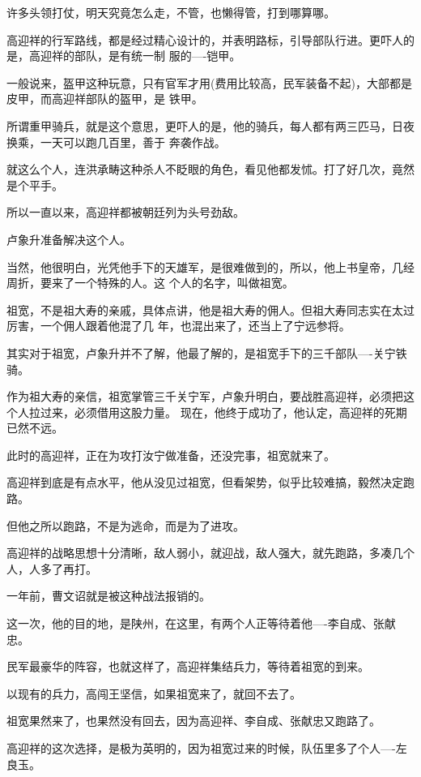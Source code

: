 \documentclass[11pt,a4paper,onecolumn]{article}
\begin{document}
许多头领打仗，明天究竟怎么走，不管，也懒得管，打到哪算哪。

高迎祥的行军路线，都是经过精心设计的，并表明路标，引导部队行进。更吓人的是，高迎祥的部队，是有统一制
服的----铠甲。

一般说来，盔甲这种玩意，只有官军才用(费用比较高，民军装备不起)，大部都是皮甲，而高迎祥部队的盔甲，是
铁甲。

所谓重甲骑兵，就是这个意思，更吓人的是，他的骑兵，每人都有两三匹马，日夜换乘，一天可以跑几百里，善于
奔袭作战。

就这么个人，连洪承畴这种杀人不眨眼的角色，看见他都发怵。打了好几次，竟然是个平手。

所以一直以来，高迎祥都被朝廷列为头号劲敌。

卢象升准备解决这个人。

当然，他很明白，光凭他手下的天雄军，是很难做到的，所以，他上书皇帝，几经周折，要来了一个特殊的人。这
个人的名字，叫做祖宽。

祖宽，不是祖大寿的亲戚，具体点讲，他是祖大寿的佣人。但祖大寿同志实在太过厉害，一个佣人跟着他混了几
年，也混出来了，还当上了宁远参将。

其实对于祖宽，卢象升并不了解，他最了解的，是祖宽手下的三千部队----关宁铁骑。

作为祖大寿的亲信，祖宽掌管三千关宁军，卢象升明白，要战胜高迎祥，必须把这个人拉过来，必须借用这股力量。
现在，他终于成功了，他认定，高迎祥的死期已然不远。

此时的高迎祥，正在为攻打汝宁做准备，还没完事，祖宽就来了。

高迎祥到底是有点水平，他从没见过祖宽，但看架势，似乎比较难搞，毅然决定跑路。

但他之所以跑路，不是为逃命，而是为了进攻。

高迎祥的战略思想十分清晰，敌人弱小，就迎战，敌人强大，就先跑路，多凑几个人，人多了再打。

一年前，曹文诏就是被这种战法报销的。

这一次，他的目的地，是陕州，在这里，有两个人正等待着他----李自成、张献忠。

民军最豪华的阵容，也就这样了，高迎祥集结兵力，等待着祖宽的到来。

以现有的兵力，高闯王坚信，如果祖宽来了，就回不去了。

祖宽果然来了，也果然没有回去，因为高迎祥、李自成、张献忠又跑路了。

高迎祥的这次选择，是极为英明的，因为祖宽过来的时候，队伍里多了个人----左良玉。

\section[\thesection]{}
\end{document}
